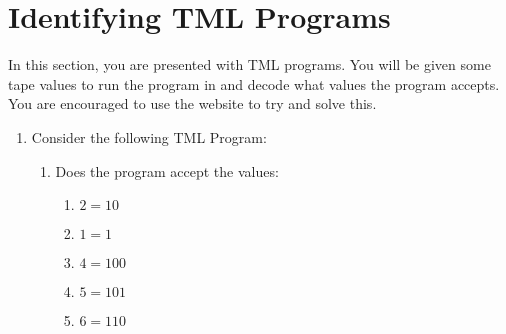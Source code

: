 \documentclass[answers]{exam}
\begin{document}
    \section{Identifying TML Programs}
    In this section, you are presented with TML programs. You will be given some tape values to run the program in and decode what values the program accepts. You are encouraged to use the website to try and solve this.

    \begin{enumerate}
        \item Consider the following TML Program:
        

        \begin{enumerate}
            \item Does the program accept the values:
            \begin{enumerate}
                \item $2 = 10$
                \begin{solution}
                    
                \end{solution}
                
                \item $1 = 1$
                \begin{solution}
                    
                \end{solution}
                
                \item $4 = 100$
                \begin{solution}
                    
                \end{solution}
                
                \item $5 = 101$
                \begin{solution}
                    
                \end{solution}
                
                \item $6 = 110$
                \begin{solution}
                    
                \end{solution}
            \end{enumerate}
            

\end{enumerate}
\end{enumerate}
\end{document}
